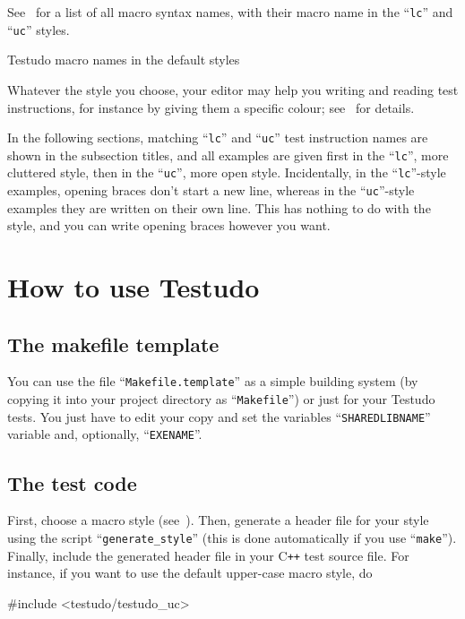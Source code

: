 \documentclass[twoside, a4paper, article]{memoir}
\providecommand*\styletext{%
  first in the ``\texttt{lc}'', more cluttered style, then in the
  ``\texttt{uc}'', more open style}
\providecommand*\openingbracesstyletext{%
  Incidentally, in the ``\texttt{lc}''-style examples, opening braces don't
  start a new line, whereas in the ``\texttt{uc}''-style examples they are
  written on their own line.  This has nothing to do with the style, and you
  can write opening braces however you want.}
\newcommand*\Cpp{C\texttt{++}}
\begin{document}
See~ for a list of all macro syntax names, with
their macro name in the ``\texttt{lc}'' and ``\texttt{uc}'' styles.

\begin{table}
  \centering
    
  \caption{Testudo macro names in the default styles}
  \label{tab:testudo-style-table}
\end{table}

Whatever the style you choose, your editor may help you writing and reading
test instructions, for instance by giving them a specific colour;
see~ for details.

In the following sections, matching ``\texttt{lc}'' and ``\texttt{uc}'' test
instruction names are shown in the subsection titles, and all examples are
given \styletext{}.  \openingbracesstyletext{}


\chapter{How to use Testudo}
\label{cha:how-to-use}

\section{The makefile template}
\label{sec:makefile-template}

You can use the file ``\texttt{Makefile.template}'' as a simple building system
(by copying it into your project directory as ``\texttt{Makefile}'') or just
for your Testudo tests.  You just have to edit your copy and set the variables
``\texttt{SHAREDLIBNAME}'' variable and, optionally, ``\texttt{EXENAME}''.

\section{The test code}
\label{sec:test-code}

First, choose a macro style
(see~).  Then, generate a
header file for your style using the script ``\texttt{generate\_style}'' (this
is done automatically if you use ``\texttt{make}'').  Finally, include the
generated header file in your \Cpp{} test source file.  For instance, if you
want to use the default upper-case macro style, do
\begin{cpplisting}
#include <testudo/testudo_uc>
\end{cpplisting}
\end{document}
